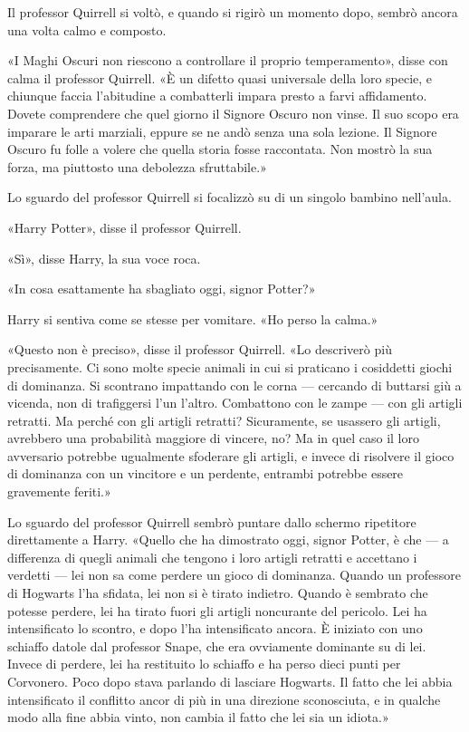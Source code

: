 Il professor Quirrell si voltò, e quando si rigirò un momento dopo, sembrò ancora una volta calmo e composto.

«I Maghi Oscuri non riescono a controllare il proprio temperamento», disse con calma il professor Quirrell. «È un difetto quasi universale della loro specie, e chiunque faccia l’abitudine a combatterli impara presto a farvi affidamento. Dovete comprendere che quel giorno il Signore Oscuro non vinse. Il suo scopo era imparare le arti marziali, eppure se ne andò senza una sola lezione. Il Signore Oscuro fu folle a volere che quella storia fosse raccontata. Non mostrò la sua forza, ma piuttosto una debolezza sfruttabile.»

Lo sguardo del professor Quirrell si focalizzò su di un singolo bambino nell’aula.

«Harry Potter», disse il professor Quirrell.

«Sì», disse Harry, la sua voce roca.

«In cosa esattamente ha sbagliato oggi, signor Potter?»

Harry si sentiva come se stesse per vomitare. «Ho perso la calma.»

«Questo non è preciso», disse il professor Quirrell. «Lo descriverò più precisamente. Ci sono molte specie animali in cui si praticano i cosiddetti giochi di dominanza. Si scontrano impattando con le corna — cercando di buttarsi giù a vicenda, non di trafiggersi l’un l’altro. Combattono con le zampe — con gli artigli retratti. Ma perché con gli artigli retratti? Sicuramente, se usassero gli artigli, avrebbero una probabilità maggiore di vincere, no? Ma in quel caso il loro avversario potrebbe ugualmente sfoderare gli artigli, e invece di risolvere il gioco di dominanza con un vincitore e un perdente, entrambi potrebbe essere gravemente feriti.»

Lo sguardo del professor Quirrell sembrò puntare dallo schermo ripetitore direttamente a Harry. «Quello che ha dimostrato oggi, signor Potter, è che — a differenza di quegli animali che tengono i loro artigli retratti e accettano i verdetti — lei non sa come perdere un gioco di dominanza. Quando un professore di Hogwarts l’ha sfidata, lei non si è tirato indietro. Quando è sembrato che potesse perdere, lei ha tirato fuori gli artigli noncurante del pericolo. Lei ha intensificato lo scontro, e dopo l’ha intensificato ancora. È iniziato con uno schiaffo datole dal professor Snape, che era ovviamente dominante su di lei. Invece di perdere, lei ha restituito lo schiaffo e ha perso dieci punti per Corvonero. Poco dopo stava parlando di lasciare Hogwarts. Il fatto che lei abbia intensificato il conflitto ancor di più in una direzione sconosciuta, e in qualche modo alla fine abbia vinto, non cambia il fatto che lei sia un idiota.»

